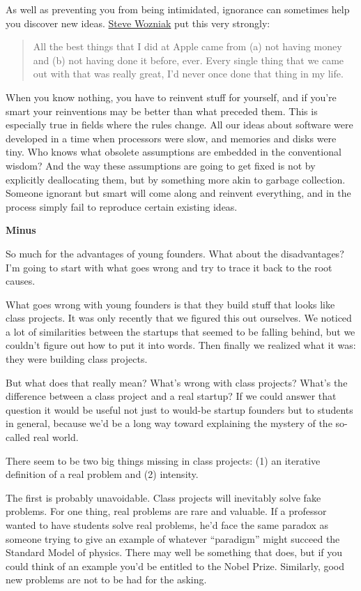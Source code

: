 \documentclass[12pt]{book}
\begin{document}
As well as preventing you from being intimidated, ignorance can
sometimes help you discover new ideas.
\href{http://foundersatwork.com/stevewozniak.html}{Steve Wozniak} put
this very strongly:

\begin{quote}
All the best things that I did at Apple came from (a) not having money
and (b) not having done it before, ever. Every single thing that we came
out with that was really great, I'd never once done that thing in my
life.
\end{quote}

When you know nothing, you have to reinvent stuff for yourself, and if
you're smart your reinventions may be better than what preceded them.
This is especially true in fields where the rules change. All our ideas
about software were developed in a time when processors were slow, and
memories and disks were tiny. Who knows what obsolete assumptions are
embedded in the conventional wisdom? And the way these assumptions are
going to get fixed is not by explicitly deallocating them, but by
something more akin to garbage collection. Someone ignorant but smart
will come along and reinvent everything, and in the process simply fail
to reproduce certain existing ideas.

\textbf{Minus}

So much for the advantages of young founders. What about the
disadvantages? I'm going to start with what goes wrong and try to trace
it back to the root causes.

What goes wrong with young founders is that they build stuff that looks
like class projects. It was only recently that we figured this out
ourselves. We noticed a lot of similarities between the startups that
seemed to be falling behind, but we couldn't figure out how to put it
into words. Then finally we realized what it was: they were building
class projects.

But what does that really mean? What's wrong with class projects? What's
the difference between a class project and a real startup? If we could
answer that question it would be useful not just to would-be startup
founders but to students in general, because we'd be a long way toward
explaining the mystery of the so-called real world.

There seem to be two big things missing in class projects: (1) an
iterative definition of a real problem and (2) intensity.

The first is probably unavoidable. Class projects will inevitably solve
fake problems. For one thing, real problems are rare and valuable. If a
professor wanted to have students solve real problems, he'd face the
same paradox as someone trying to give an example of whatever
``paradigm'' might succeed the Standard Model of physics. There may well
be something that does, but if you could think of an example you'd be
entitled to the Nobel Prize. Similarly, good new problems are not to be
had for the asking.
\end{document}
